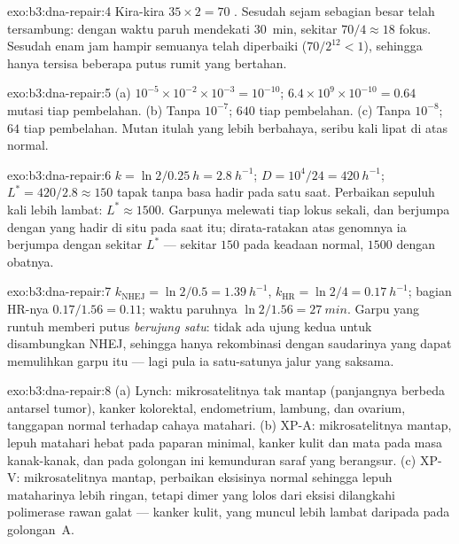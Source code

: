 \begin{solution}{exo:b3:dna-repair:4}
Kira-kira $35\times 2 = 70$ . Sesudah sejam sebagian besar
telah tersambung: dengan waktu paruh mendekati \qty{30}{min}, sekitar
$70/4 \approx 18$ fokus. Sesudah enam jam hampir semuanya telah diperbaiki
($70/2^{12} < 1$), sehingga hanya tersisa beberapa putus rumit yang bertahan.
\end{solution}

\begin{solution}{exo:b3:dna-repair:5}
(a) $10^{-5}\times 10^{-2}\times 10^{-3} = 10^{-10}$; $6.4\times
10^{9}\times 10^{-10} = 0.64$ mutasi tiap pembelahan. (b) Tanpa
 $10^{-7}$; $640$ tiap pembelahan. (c) Tanpa 
$10^{-8}$; $64$ tiap pembelahan. Mutan  itulah yang
lebih berbahaya, seribu kali lipat di atas normal.
\end{solution}

\begin{solution}{exo:b3:dna-repair:6}
$k = \ln 2/\qty{0.25}{h} = \qty{2.8}{h^{-1}}$; $D = 10^{4}/24 =
\qty{420}{h^{-1}}$; $L^{*} = 420/2.8 \approx 150$ tapak tanpa basa hadir
pada satu saat. Perbaikan sepuluh kali lebih lambat: $L^{*} \approx \num{1500}$.
Garpunya melewati tiap lokus sekali, dan berjumpa dengan  yang hadir di
situ pada saat itu; dirata-ratakan atas genomnya ia berjumpa dengan sekitar
$L^{*}$  --- sekitar $150$ pada keadaan normal, $\num{1500}$ dengan obatnya.
\end{solution}

\begin{solution}{exo:b3:dna-repair:7}
$k_{\text{NHEJ}} = \ln 2/0.5 = \qty{1.39}{h^{-1}}$, $k_{\text{HR}} =
\ln 2/4 = \qty{0.17}{h^{-1}}$; bagian HR-nya $0.17/1.56 = 0.11$;
waktu paruhnya $\ln 2/1.56 = \qty{27}{min}$. Garpu yang runtuh memberi
putus \emph{berujung satu}: tidak ada ujung kedua untuk disambungkan NHEJ,
sehingga hanya rekombinasi dengan saudarinya yang dapat memulihkan garpu itu
--- lagi pula ia satu-satunya jalur yang saksama.
\end{solution}

\begin{solution}{exo:b3:dna-repair:8}
(a) Lynch: mikrosatelitnya tak mantap (panjangnya berbeda antarsel
tumor), kanker kolorektal, endometrium, lambung, dan ovarium, tanggapan
normal terhadap cahaya matahari. (b) XP-A: mikrosatelitnya mantap, lepuh
matahari hebat pada paparan minimal, kanker kulit dan mata pada masa
kanak-kanak, dan pada golongan ini kemunduran saraf yang berangsur. (c) XP-V:
mikrosatelitnya mantap, perbaikan eksisinya normal sehingga lepuh mataharinya
lebih ringan, tetapi dimer yang lolos dari eksisi dilangkahi polimerase rawan
galat --- kanker kulit, yang muncul lebih lambat daripada pada golongan~A.
\end{solution}

